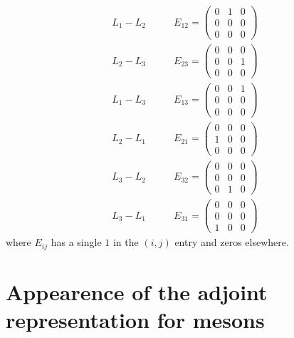 \documentclass[12pt]{article}
\begin{document}
\begin{align*}
L_1 - L_2  & \quad \quad E_{12} = 
\begin{pmatrix}
0 & 1 & 0
\\
0 & 0 & 0
\\
0 & 0 & 0
\end{pmatrix}
\\
L_2 - L_3  & \quad \quad E_{23} = 
\begin{pmatrix}
0 & 0 & 0
\\
0 & 0 & 1
\\
0 & 0 & 0
\end{pmatrix}
\\
L_1 - L_3  & \quad \quad E_{13} = 
\begin{pmatrix}
0 & 0 & 1
\\
0 & 0 & 0
\\
0 & 0 & 0
\end{pmatrix}
\\
L_2 - L_1  & \quad \quad E_{21} = 
\begin{pmatrix}
0 & 0 & 0
\\
1 & 0 & 0
\\
0 & 0 & 0
\end{pmatrix}
\\
L_3 - L_2 & \quad \quad E_{32} = 
\begin{pmatrix}
0 & 0 & 0
\\
0 & 0 & 0
\\
0 & 1 & 0
\end{pmatrix}
\\
L_3 - L_1  & \quad \quad E_{31} = 
\begin{pmatrix}
0 & 0 & 0
\\
0 & 0 & 0
\\
1 & 0 & 0
\end{pmatrix}
\end{align*}
where $E_{ij}$ has a single $1$ in the $(i,j)$ entry and zeros elsewhere.

\section{Appearence of the adjoint representation for mesons}

\newcommand{\gl}{\mathfrak{gl}}
\newcommand{\inner}[2]{\left< #1 , #2 \right>}
\end{document}
